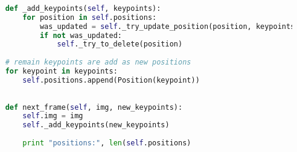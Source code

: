 \documentclass[hidelinks,11pt,a4paper,oneside,article]{memoir}
\begin{document}
\begin{lstlisting}[label={listing:tracking},caption={Implementation of the tracking algorithm},language=Python, style=styleprogramming]
    
    def _add_keypoints(self, keypoints):
        for position in self.positions:
            was_updated = self._try_update_position(position, keypoints)
            if not was_updated:
                self._try_to_delete(position)
    
    # remain keypoints are add as new positions
    for keypoint in keypoints:
        self.positions.append(Position(keypoint))
    
    
    def next_frame(self, img, new_keypoints):
        self.img = img
        self._add_keypoints(new_keypoints)
        
        print "positions:", len(self.positions)

\end{lstlisting}

\clearpage %
\end{document}
